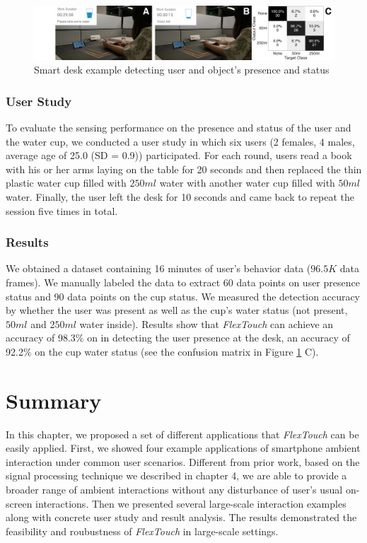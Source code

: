 \begin{figure}[ht]
\centering
  \includegraphics[width=0.95\columnwidth]{figures/FlexTouch-desk.png}
  \setlength{\belowcaptionskip}{-6pt}
  \caption{Smart desk example detecting user and object's presence and status}
  \label{fig:smartdesk}
\end{figure}

\subsubsection{User Study}
To evaluate the sensing performance on the presence and status of the user and the water cup, we conducted a user study in which six users (2 females, 4 males, average age of 25.0 (SD = 0.9)) participated. For each round, users read a book with his or her arms laying on the table for 20 seconds and then replaced the thin plastic water cup filled with $250 ml$ water with another water cup filled with $50 ml$ water. Finally, the user left the desk for 10 seconds and came back to repeat the session five times in total.

\subsubsection{Results}
We obtained a dataset containing 16 minutes of user's behavior data ($96.5 K$ data frames). We manually labeled the data to extract 60 data points on user presence status and 90 data points on the cup status. We measured the detection accuracy by whether the user was present as well as the cup's water status (not present, $50 ml$ and $250 ml$ water inside). Results show that \textit{FlexTouch} can achieve an accuracy of 98.3\% on in detecting the user presence at the desk, an accuracy of 92.2\% on the cup water status (see the confusion matrix in Figure \ref{fig:smartdesk} C).

\section{Summary}
In this chapter, we proposed a set of different applications that \textit{FlexTouch} can be easily applied. First, we showed four example applications of smartphone ambient interaction under common user scenarios. Different from prior work, based on the signal processing technique we described in chapter 4, we are able to provide a broader range of ambient interactions without any disturbance of user's usual on-screen interactions. Then we presented several large-scale interaction examples along with concrete user study and result analysis. The results demonstrated the feasibility and roubustness of \textit{FlexTouch} in large-scale settings.